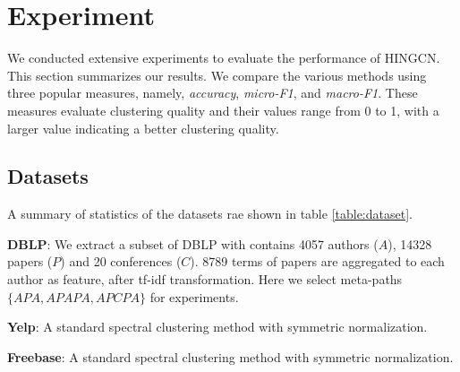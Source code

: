 \section{Experiment}
\label{sec:exp}
We conducted extensive experiments
to evaluate the performance of HINGCN.
This section summarizes our results. 
We compare the various methods using three popular measures, 
namely, \emph{accuracy}, \emph{micro-F1}, and \emph{macro-F1}.
These measures evaluate clustering quality and their values range from 0 to 1, 
with a larger value indicating a better
clustering quality. 

\subsection{Datasets}
A summary of statistics of the datasets rae shown in table \ref{table:dataset}.

\noindent{\small$\bullet$}
\textbf{DBLP}: We extract a subset of DBLP with contains 4057 authors ($A$), 14328 papers ($P$) and 20 conferences ($C$). 8789 terms of papers are aggregated to each author as feature, after tf-idf transformation. Here we select meta-paths $\{APA,APAPA,APCPA\}$ for experiments.

\noindent{\small$\bullet$}
\textbf{Yelp}: A standard spectral clustering method with symmetric normalization.

\noindent{\small$\bullet$}
\textbf{Freebase}: A standard spectral clustering method with symmetric normalization.

